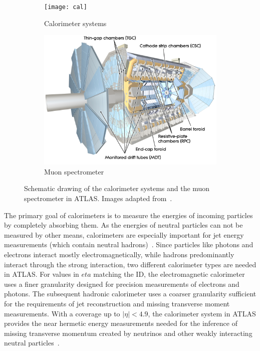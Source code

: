 \begin{figure}
	\centering
	\begin{subfigure}[b]{0.45\linewidth}
		\centering\texttt{[image: cal]}
		\caption{Calorimeter systems\label{fig:calorimeters}}
	\end{subfigure}%
	\begin{subfigure}[b]{0.45\linewidth}
		\centering\includegraphics[width=\textwidth]{ms}
		\caption{Muon spectrometer\label{fig:muon_system}}
	\end{subfigure}%
	\caption{Schematic drawing of the calorimeter systems and the muon spectrometer in ATLAS. Images adapted from~\cite{Pequenao:1095927,Pequenao:1095929}.}\label{fig:cal_ms_schematic}
\end{figure}

The primary goal of calorimeters is to measure the energies of incoming particles by completely absorbing them. As the energies of neutral particles can not be measured by other means, calorimeters are especially important for jet energy measurements (which contain neutral hadrons)~\cite{Brock:1354959}. Since particles like photons and electrons interact mostly electromagnetically, while hadrons predominantly interact through the strong interaction, two different calorimeter types are needed in ATLAS. For values in $eta$ matching the ID, the electromagnetic calorimeter uses a finer granularity designed for precision measurements of electrons and photons. The subsequent hadronic calorimeter uses a coarser granularity sufficient for the requirements of jet reconstruction and missing transverse moment measurements. With a coverage up to $\vert\eta\vert <4.9$, the calorimeter system in ATLAS provides the near hermetic energy measurements needed for the inference of missing transverse momentum created by neutrinos and other weakly interacting neutral particles~\cite{Aad:2008zzm}.

